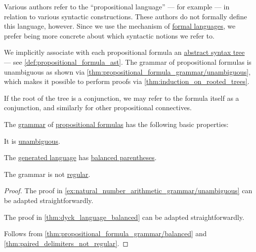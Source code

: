 \begin{comments}
  \item Various authors refer to the \enquote{propositional language} --- for example  --- in relation to various syntactic constructions. These authors do not formally define this language, however. Since we use the mechanism of \hyperref[def:formal_language]{formal languages}, we prefer being more concrete about which syntactic notions we refer to.

  \item We implicitly associate with each propositional formula an \hyperref[con:abstract_syntax_tree]{abstract syntax tree} --- see \cref{def:propositional_formula_ast}. The grammar of propositional formulas is unambiguous as shown via \cref{thm:propositional_formula_grammar/unambiguous}, which makes it possible to perform proofs via \cref{thm:induction_on_rooted_trees}.

  \item If the root of the tree is a conjunction, we may refer to the formula itself as a conjunction, and similarly for other propositional connectives.
\end{comments}

\begin{proposition}\label{thm:propositional_formula_grammar}
  The \hyperref[def:formal_grammar]{grammar} of \hyperref[def:propositional_syntax/formula]{propositional formulas} has the following basic properties:
  \begin{thmenum}
     It is \hyperref[def:grammar_ambiguity]{unambiguous}.

     The \hyperref[def:formal_grammar/language]{generated language} has \hyperref[def:paired_delimiters]{balanced parentheses}.

     The grammar is not \hyperref[def:chomsky_hierarchy/regular]{regular}.
  \end{thmenum}
\end{proposition}
\begin{proof}
   The proof in \cref{ex:natural_number_arithmetic_grammar/unambiguous} can be adapted straightforwardly.

   The proof in \cref{thm:dyck_language_balanced} can be adapted straightforwardly.

   Follows from \cref{thm:propositional_formula_grammar/balanced} and \cref{thm:paired_delimiters_not_regular}.
\end{proof}

